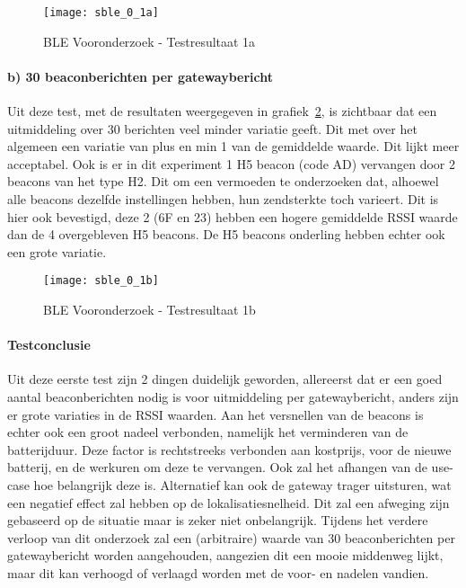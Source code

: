 \begin{figure}[h]
	\texttt{[image: sble\_0\_1a]}
	\caption{BLE Vooronderzoek - Testresultaat 1a}
	\label{fig:ond-ble-1a-res}
\end{figure}

\paragraph{b) 30 beaconberichten per gatewaybericht}
Uit deze test, met de resultaten weergegeven in grafiek~\ref{fig:ond-ble-1b-res}, is zichtbaar dat een uitmiddeling over 30 berichten veel minder variatie geeft. Dit met over het algemeen een variatie van plus en min 1 van de gemiddelde waarde. Dit lijkt meer acceptabel. Ook is er in dit experiment 1 H5 beacon (code AD) vervangen door 2 beacons van het type H2. Dit om een vermoeden te onderzoeken dat, alhoewel alle beacons dezelfde instellingen hebben, hun zendsterkte toch varieert. Dit is hier ook bevestigd, deze 2 (6F en 23) hebben een hogere gemiddelde RSSI waarde dan de 4 overgebleven H5 beacons. De H5 beacons onderling hebben echter ook een grote variatie.

\begin{figure}[h]
	\texttt{[image: sble\_0\_1b]}
	\caption{BLE Vooronderzoek - Testresultaat 1b}
	\label{fig:ond-ble-1b-res}
\end{figure}

\paragraph{Testconclusie}
Uit deze eerste test zijn 2 dingen duidelijk geworden, allereerst dat er een goed aantal beaconberichten nodig is voor uitmiddeling per gatewaybericht, anders zijn er grote variaties in de RSSI waarden. Aan het versnellen van de beacons is echter ook een groot nadeel verbonden, namelijk het verminderen van de batterijduur. Deze factor is rechtstreeks verbonden aan kostprijs, voor de nieuwe batterij, en de werkuren om deze te vervangen. Ook zal het afhangen van de use-case hoe belangrijk deze is. Alternatief kan ook de gateway trager uitsturen, wat een negatief effect zal hebben op de lokalisatiesnelheid. Dit zal een afweging zijn gebaseerd op de situatie maar is zeker niet onbelangrijk. Tijdens het verdere verloop van dit onderzoek zal een (arbitraire) waarde van 30 beaconberichten per gatewaybericht worden aangehouden, aangezien dit een mooie middenweg lijkt, maar dit kan verhoogd of verlaagd worden met de voor- en nadelen vandien.

